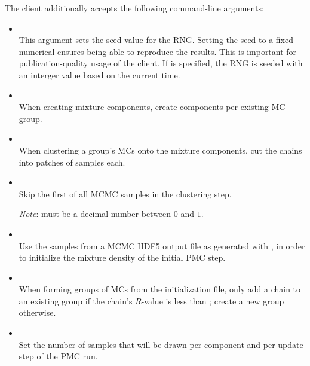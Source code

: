 The  client additionally accepts the following command-line arguments:
\begin{itemize}
    \item[] \\[\medskipamount]
        This argument sets the seed value for the \gls{RNG}. Setting the
        seed to a fixed numerical  ensures being able to reproduce the results. This
        is important for publication-quality usage of the client. If  is
        specified, the \gls{RNG} is seeded with an interger value based on the current time.

    \item[] \\[\medskipamount]
        When creating mixture components, create  components per existing
        MC group.

    \item[] \\[\medskipamount]
        When clustering a group's MCs onto the mixture components, cut the
        chains into patches of  samples each.

    \item[] \\[\medskipamount]
        Skip the first  of all MCMC samples in the clustering step.

        \emph{Note}:  must be a decimal number between $0$ and $1$.

    \item[] \\[\medskipamount]
        Use the samples from a MCMC HDF5 output file  as
        generated with , in order to initialize the
        mixture density of the initial PMC step.

    \item[] \\[\medskipamount]
        When forming groups of MCs from the initialization file, only add
        a chain to an existing group if the chain's $R$-value is less than ;
        create a new group otherwise.

    \item[] \\[\medskipamount]
        Set the number  of samples that will be drawn per component and
        per update step of the PMC run.


\end{itemize}

